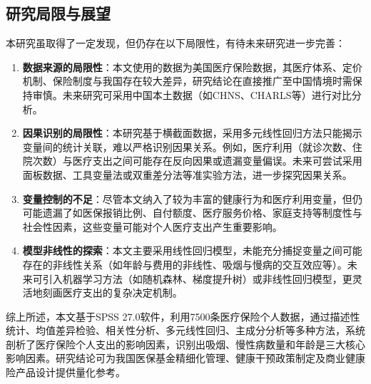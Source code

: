 \documentclass[a4paper]{ctexart}
\begin{document}
\subsection{研究局限与展望}

本研究虽取得了一定发现，但仍存在以下局限性，有待未来研究进一步完善：

\begin{enumerate}[label=(\arabic*)]
\item \textbf{数据来源的局限性}：本文使用的数据为美国医疗保险数据，其医疗体系、定价机制、保险制度与我国存在较大差异，研究结论在直接推广至中国情境时需保持审慎。未来研究可采用中国本土数据（如CHNS、CHARLS等）进行对比分析。

\item \textbf{因果识别的局限性}：本研究基于横截面数据，采用多元线性回归方法只能揭示变量间的统计关联，难以严格识别因果关系。例如，医疗利用（就诊次数、住院次数）与医疗支出之间可能存在反向因果或遗漏变量偏误。未来可尝试采用面板数据、工具变量法或双重差分法等准实验方法，进一步探究因果关系。

\item \textbf{变量控制的不足}：尽管本文纳入了较为丰富的健康行为和医疗利用变量，但仍可能遗漏了如医保报销比例、自付额度、医疗服务价格、家庭支持等制度性与社会性因素，这些变量可能对个人医疗支出产生重要影响。

\item \textbf{模型非线性的探索}：本文主要采用线性回归模型，未能充分捕捉变量之间可能存在的非线性关系（如年龄与费用的非线性、吸烟与慢病的交互效应等）。未来可引入机器学习方法（如随机森林、梯度提升树）或非线性回归模型，更灵活地刻画医疗支出的复杂决定机制。
\end{enumerate}

综上所述，本文基于SPSS 27.0软件，利用7500条医疗保险个人数据，通过描述性统计、均值差异检验、相关性分析、多元线性回归、主成分分析等多种方法，系统剖析了医疗保险个人支出的影响因素，识别出吸烟、慢性病数量和年龄是三大核心影响因素。研究结论可为我国医保基金精细化管理、健康干预政策制定及商业健康险产品设计提供量化参考。


\newpage
{}

\section*{}

\nocite{*}
\printbibliography
\end{document}
